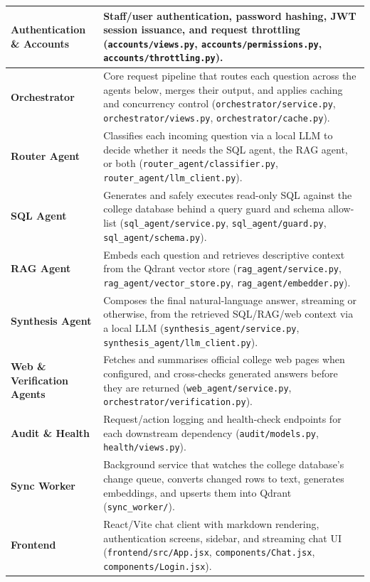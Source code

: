 \documentclass[11pt,a4paper]{article}
\begin{document}
\renewcommand{\arraystretch}{1.3}
\begin{tabularx}{\linewidth}{|>{\bfseries}p{3.9cm}|X|}
\hline
Authentication \& Accounts & Staff/user authentication, password hashing,
JWT session issuance, and request throttling
(\texttt{accounts/views.py}, \texttt{accounts/permissions.py},
\texttt{accounts/throttling.py}). \\
\hline
Orchestrator & Core request pipeline that routes each question across the
agents below, merges their output, and applies caching and concurrency
control (\texttt{orchestrator/service.py}, \texttt{orchestrator/views.py},
\texttt{orchestrator/cache.py}). \\
\hline
Router Agent & Classifies each incoming question via a local LLM to decide
whether it needs the SQL agent, the RAG agent, or both
(\texttt{router\_agent/classifier.py}, \texttt{router\_agent/llm\_client.py}). \\
\hline
SQL Agent & Generates and safely executes read-only SQL against the college
database behind a query guard and schema allow-list
(\texttt{sql\_agent/service.py}, \texttt{sql\_agent/guard.py},
\texttt{sql\_agent/schema.py}). \\
\hline
RAG Agent & Embeds each question and retrieves descriptive context from the
Qdrant vector store (\texttt{rag\_agent/service.py},
\texttt{rag\_agent/vector\_store.py}, \texttt{rag\_agent/embedder.py}). \\
\hline
Synthesis Agent & Composes the final natural-language answer, streaming or
otherwise, from the retrieved SQL/RAG/web context via a local LLM
(\texttt{synthesis\_agent/service.py}, \texttt{synthesis\_agent/llm\_client.py}). \\
\hline
Web \& Verification Agents & Fetches and summarises official college web
pages when configured, and cross-checks generated answers before they are
returned (\texttt{web\_agent/service.py}, \texttt{orchestrator/verification.py}). \\
\hline
Audit \& Health & Request/action logging and health-check endpoints for
each downstream dependency (\texttt{audit/models.py}, \texttt{health/views.py}). \\
\hline
Sync Worker & Background service that watches the college database's
change queue, converts changed rows to text, generates embeddings, and
upserts them into Qdrant (\texttt{sync\_worker/}). \\
\hline
Frontend & React/Vite chat client with markdown rendering, authentication
screens, sidebar, and streaming chat UI
(\texttt{frontend/src/App.jsx}, \texttt{components/Chat.jsx},
\texttt{components/Login.jsx}). \\
\hline
\end{tabularx}
\end{document}
